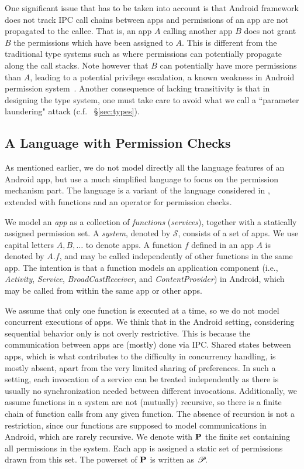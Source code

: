 One significant issue that has to be taken into account is that Android framework does not track IPC call chains between apps and permissions of an app are not propagated to the callee. That is, an app $A$ calling another app $B$ does not grant $B$ the permissions which have been assigned to $A$. This is different from the traditional type systems such as {\BN} where permissions can potentially propagate along the call stacks. Note however that $B$ can potentially have more permissions than $A$, leading to a potential privilege escalation, a known weakness in Android permission system~\cite{Chin:2011wa}. Another consequence of lacking transitivity is that in designing the type system, one must take care to avoid what we call a ``parameter laundering" attack (c.f. ~\S\ref{sec:types}).

\subsection{A Language with Permission Checks}\label{sec:language}

As mentioned earlier, we do not model directly all the language features of an Android app, but use a much simplified language to focus on the permission mechanism part. The language is a variant of the  language considered in \cite{Volpano:1996}, extended with functions and an operator for permission checks.

We model an \emph{app} as a collection of \emph{functions}
(\emph{services}), together with a statically assigned permission
set. A \emph{system}, denoted by $\mathcal{S}$, consists of a set of
apps. We use capital letters $A,B,\ldots$ to denote apps. A function
$f$ defined in an app $A$ is denoted by $A.f$, and may be called
independently of other functions in the same app. The intention is
that a function models an  application component (i.e.,
\emph{Activity}, \emph{Service}, \emph{BroadCastReceiver}, and
\emph{ContentProvider}) in Android, which may be called from within
the same app or other apps.

We assume that only one function is
executed at a time, so we do not model concurrent executions of
apps. We think that in the Android setting, considering sequential behavior only is
not overly restrictive. This is because the communication between apps are
(mostly) done via IPC. Shared states between apps,
which is what contributes to the difficulty in concurrency handling, is mostly
absent, apart from the very limited sharing of preferences. In such a setting,
each invocation of a service can be treated independently as there is usually
no synchronization needed between different invocations. Additionally, we assume functions in a system are not (mutually)
recursive, so there is a finite chain of function calls from any given
function. The absence of recursion is not a restriction, since our
functions are supposed to model communications in Android, which are
rarely recursive. We denote with $\mathbf{P}$ the finite set containing all permissions in
the system. Each app is assigned a static set of permissions drawn
from this set. The powerset of $\mathbf{P}$ is written as~$\!\mathscr{P}\!$.  


